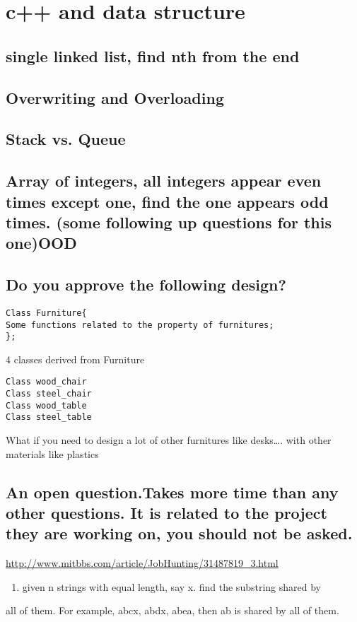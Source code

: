 \documentclass[12pt]{book}
\begin{document}
\chapter{c++ and data structure}
\label{sec-19}
\section{single linked list, find nth from the end}
\label{sec-19-1}
\section{Overwriting and Overloading}
\label{sec-19-2}
\section{Stack vs. Queue}
\label{sec-19-3}
\section{Array of integers, all integers appear even times except one, find the one appears odd times. (some following up questions for this one)OOD}
\label{sec-19-4}
\section{Do you approve the following design?}
\label{sec-19-5}
\lstset{language=java,label= ,caption= ,numbers=none}
\begin{lstlisting}
Class Furniture{    
Some functions related to the property of furnitures;
};
\end{lstlisting}
4 classes derived from Furniture
\lstset{language=java,label= ,caption= ,numbers=none}
\begin{lstlisting}
Class wood_chair
Class steel_chair
Class wood_table
Class steel_table
\end{lstlisting}
What if you need to design a lot of other furnitures like desks\ldots{}. with other materials like plastics 
\section{An open question.Takes more time than any other questions. It is related to the project they are working on, you should not be asked.}
\label{sec-19-6}

\url{http://www.mitbbs.com/article/JobHunting/31487819_3.html}

\begin{enumerate}
\item given n strings with equal length, say x. find the substring shared by
\end{enumerate}
all of them. For example, abcx, abdx, abea, then ab is shared by all of them.
\end{document}
